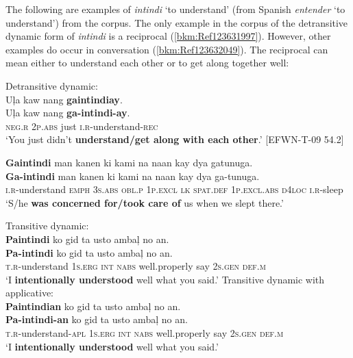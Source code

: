 The following are examples of \textit{intindi} ‘to understand’ (from Spanish \textit{entender} ‘to understand’) from the corpus. The only example in the corpus of the detransitive dynamic form of \textit{intindi} is a reciprocal (\ref{bkm:Ref123631997}). However, other examples do occur in conversation (\ref{bkm:Ref123632049}). The reciprocal can mean either to understand each other or to get along together well:

\ea 
\label{bkm:Ref123631997}
Detransitive dynamic: \\
Uļa  kaw  nang  \textbf{gaintindiay}. \\\smallskip
\gll Uļa  kaw  nang  \textbf{ga-intindi-ay}. \\
\textsc{neg.r}  2\textsc{p.abs}  just  \textsc{i.r}-understand-\textsc{rec} \\
\glt ‘You just didn’t \textbf{understand/get along with each other}.’ [EFWN-T-09 54.2]
\z

\newpage
\ea
\label{bkm:Ref123632049}
\textbf{Gaintindi}  man  kanen  ki  kami  na  naan  kay  dya gatunuga. \\\smallskip
\gll \textbf{Ga-intindi}  man  kanen  ki  kami  na  naan  kay  dya ga-tunuga. \\
\textsc{i.r}-understand  \textsc{emph}  3\textsc{s.abs}  \textsc{obl.p}  1\textsc{p.excl}  \textsc{lk}  \textsc{spat.def}  1\textsc{p.excl.abs}  \textsc{d4loc} \textsc{i.r}-sleep \\
\glt `S/he \textbf{was concerned for/took care of} us when we slept there.’
\z

\ea
Transitive dynamic: \\
\textbf{Paintindi}  ko  gid  ta  usto  ambaļ  no  an. \\\smallskip
\gll \textbf{Pa-intindi}  ko  gid  ta  usto  ambaļ  no  an. \\
\textsc{t.r}-understand  1\textsc{s.erg}  \textsc{int}  \textsc{nabs}  well.properly  say  2\textsc{s.gen}  \textsc{def.m} \\
\glt ‘I \textbf{intentionally understood} well what you said.’
\z
\ea
Transitive dynamic with applicative: \\
\textbf{Paintindian}  ko  gid  ta  usto  ambaļ  no  an. \\\smallskip
\gll \textbf{Pa-intindi-an}  ko  gid  ta  usto  ambaļ  no  an. \\
\textsc{t.r}-understand-\textsc{apl}  1\textsc{s.erg}  \textsc{int}  \textsc{nabs}  well.properly  say  2\textsc{s.gen}  \textsc{def.m} \\
\glt ‘I \textbf{intentionally understood} well what you said.’
\z

